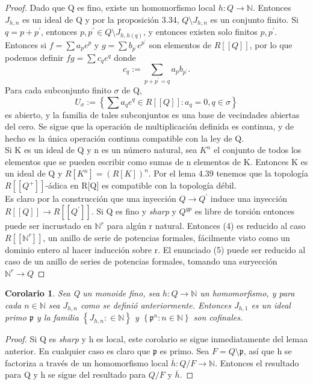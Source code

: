\documentclass[12pt,spanish]{amsart}
\newcommand{\bb}[1]{\mathbb{#1}}
\newcommand{\fk}[1]{\mathfrak{#1}}
\newcommand{\set}[1]{\left\{{#1}\right\}}
\newtheorem{cor}[Theorem]{Corolario}
\theoremstyle{definition}
\theoremstyle{remark}
\begin{document}
\begin{proof}
Dado que Q es fino, existe un homomorfismo local $h: Q \to \bb{N}$. Entonces $J_{h,n}$ es un ideal de Q y por la proposición 3.34, $Q \setminus J_{h,n}$ es un conjunto finito. Si $q=p+p^{\prime}$, entonces $p,p^{\prime}\in Q \setminus J_{h,h(q)}$, y entonces existen solo finitos $p,p^{\prime}$. Entonces si $f=\sum a_{p}e^{p}$ y $g=\sum b_{p^{\prime}}e^{p^{\prime}}$ son elementos de $R[[Q]]$, por lo que podemos definir $fg=\sum c_{q}e^{q}$ donde 
$$c_{q}:=\sum_{p+p^{\prime}=q}a_{p}b_{p^{\prime}}.$$
Para cada subconjunto finito $\sigma$ de Q,
$$U_{\sigma}:= \set{\sum a_{q}e^{q}\in R[[Q]]:a_{q}=0,q\in \sigma}$$
es abierto, y la familia de tales subconjuntos es una base de vecindades abiertas del cero. Se sigue que la operación de multiplicación definida es continua, y de hecho es la única operación continua compatible con la ley de Q. \\ 
Si K es un ideal de Q y n es un número natural, sea $K^{n}$ el conjunto de todos los elementos que se pueden escribir como sumas de n elementos de K. Entonces K es un ideal de Q y $R[K^{n}]=(R[K])^{n}$. Por el lema 4.39 tenemos que la topología $R[[Q^{+}]]$-ádica en R[Q] es compatible con la topología débil. \\
Es claro por la construcción que una inyección $Q \to Q^{\prime}$ induce una inyección $R[[Q]] \to R[[Q^{\prime}]]$. Si Q es fino y \textit{sharp} y $Q^{gp}$ es libre de torsión entonces puede ser incrustado en $\bb{N}^{r}$ para algún r natural. Entonces (4) es reducido al caso $R[[\bb{N}^{r}]]$, un anillo de serie de potencias formales, fácilmente visto como un dominio entero al hacer inducción sobre r. El enunciado (5) puede ser reducido al caso de un anillo de series de potencias formales, tomando una suryección $\bb{N}^{r} \to Q$ 
\end{proof}


\begin{cor}
Sea Q un monoide fino, sea $h:Q \to \bb{N}$ un homomorfismo, y para cada $n\in \bb{N}$ sea $J_{h,n}$ como se definió anteriormente. Entonces $J_{h,1}$ es un ideal primo $\fk{p}$ y la familia $\set{J_{h,n}:\in \bb{N}}$ y $\set{\fk{p}^{n}:n\in \bb{N}}$ son cofinales.   
\end{cor}

\begin{proof}
 Si Q es \textit{sharp} y h es local, este corolario se sigue inmediatamente del lemaa anterior. En cualquier caso es claro que $\fk{p}$ es primo. Sea $F=Q \setminus \fk{p}$, así que h se factoriza a través de un homomorfismo local $\overline{h}:Q/F \to \bb{N}$. Entonces el resultado para Q y h se sigue del resultado para $Q/F$ y $\overline{h}$. 
\end{proof}
\end{document}
